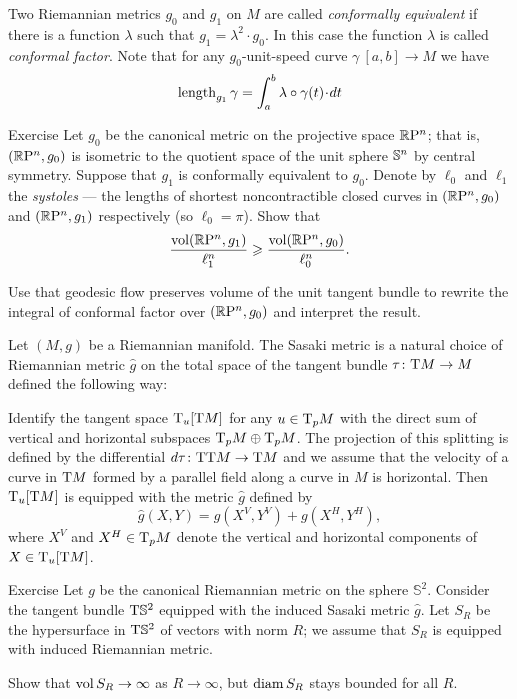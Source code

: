 Two Riemannian metrics $g_0$ and $g_1$ on $M$ are called \emph{conformally equivalent} if there is a function $\lambda$ such that $g_1=\lambda^2\cdot g_0$.
In this case the function $\lambda$ is called \emph{conformal factor}.
Note that for any $g_0$-unit-speed curve $\gamma\:[a,b]\to M$ 
we have
\[\length_{g_1}\gamma=\int_a^b\lambda\circ\gamma(t)\cdot dt\]

\begin{thm}{Exercise}
Let $g_0$ be the canonical metric on the projective space $\mathbb{R}\mathrm{P}^n$; 
that is, $(\mathbb{R}\mathrm{P}^n,g_0)$ is isometric to the quotient space of the unit sphere $\mathbb{S}^n$ by central symmetry.
Suppose that $g_1$ is conformally equivalent to $g_0$.
Denote by $\ell_0$ and $\ell_1$ the \emph{systoles} --- the lengths of shortest noncontractible closed curves in $(\mathbb{R}\mathrm{P}^n,g_0)$ and $(\mathbb{R}\mathrm{P}^n,g_1)$ respectively (so $\ell_0=\pi$).
Show that 
\[\frac{\operatorname{\rm vol}\nolimits(\mathbb{R}\mathrm{P}^n,g_1)}{\ell_1^n}\geqslant \frac{\operatorname{\rm vol}\nolimits(\mathbb{R}\mathrm{P}^n,g_0)}{\ell_0^n}.\]
\end{thm}

 Use that geodesic flow preserves volume of the unit tangent bundle to rewrite the integral of conformal factor over $(\mathbb{R}\mathrm{P}^n,g_0)$ and interpret the result.

\bigskip

Let $(M,g)$ be a Riemannian manifold.
The Sasaki metric is a natural choice of Riemannian metric $\hat g$ on the total space of the tangent bundle $\tau\colon\mathrm{T} M\to M$ defined the following way:

Identify the tangent space 
$\mathrm{T}_u[\mathrm{T} M]$ for any $u\z\in \T_p M$ with the direct sum of vertical and horizontal subspaces $\T_p M\z\oplus \T_p M$.
The projection of this splitting is defined by the differential $d\tau\colon\mathrm{T}\mathrm{T} M\to \mathrm{T} M$
and we assume that the velocity of a curve in $\mathrm{T} M$ formed by a parallel field along a curve in $M$ is horizontal.
Then $\mathrm{T}_u[\mathrm{T} M]$ is equipped with the metric $\hat g$ defined by
\[\hat g(X,Y)=g(X^V,Y^V)+g(X^H,Y^H),\]
where $X^V$ and $X^H\in\mathrm{T}_pM$ denote the vertical and horizontal components of $X\in\mathrm{T}_u[\mathrm{T} M]$.



\begin{thm}{Exercise}
Let $g$ be the canonical Riemannian metric on the sphere $\mathbb{S}^2$.
Consider the tangent bundle $\mathrm{T} \mathbb{S}^2$ 
equipped with the induced Sasaki metric $\hat g$.
Let $S_R$ be the hypersurface in $\mathrm{T} \mathbb{S}^2$ of vectors with norm $R$;
we assume that $S_R$ is equipped with induced Riemannian metric.

Show that $\operatorname{\rm vol}\nolimits S_R\to \infty$ as $R\to\infty$,
but $\operatorname{\rm diam}\nolimits S_R$ stays bounded for all $R$.
\end{thm}



